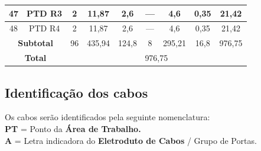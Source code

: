 \documentclass[	DIV=calc,%
							paper=a4,%
							fontsize=12pt,%
							onecolumn]{scrartcl}	 					%
\begin{document}
{\begin{tabular}{|c|c|c|c|c|c|c|c|c|}
	47                 & PTD R3             & 2                                                    & 11,87                                       & 2,6                                           & ---                                           & 4,6                                              & 0,35                                            & 21,42                                                             \\ \hline
	48                 & PTD R4             & 2                                                    & 11,87                                       & 2,6                                           & ---                                           & 4,6                                              & 0,35                                            & 21,42                                                             \\ \hline
	\multicolumn{2}{|c|}{\textbf{Subtotal}} & 96                                                   & 435,94                                      & 124,8                                         & 8                                             & 295,21                                           & 16,8                                            & 976,75                                                            \\ \hline
	\multicolumn{2}{|c|}{\textbf{Total}}    & \multicolumn{7}{c|}{976,75}                                                                                                                                                                                                                                                                                                                                                 \\ \hline
\end{tabular}
}

\clearpage
{}
\recalctypearea

\subsection{Identificação dos cabos}

Os cabos serão identificados pela seguinte nomenclatura:
\\

\textbf{PT} = Ponto da \textbf{Área de Trabalho.}
\\

\textbf{A} = Letra indicadora do \textbf{Eletroduto de Cabos} / Grupo de Portas.
\\
\end{document}
